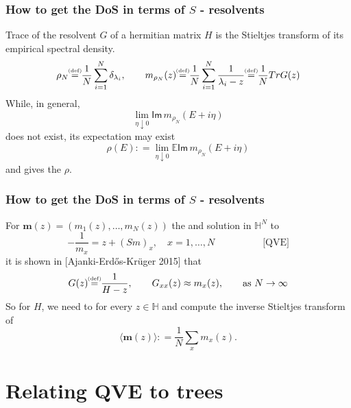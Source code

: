 \documentclass{beamer}
\numberwithin{equation}{section}
\newcommand{\eqbydef}{\mathrel{\stackrel{\hspace*{-3mm}\text{\tiny(def)}\hspace*{-3mm}}{=}}}
\newcommand{\deq}{\mathrel{\mathop:}=}
\renewcommand{\Im}{\mathsf{Im}\,}
\newcommand{\E}{{\mathbb E }}
\newcommand{\Cr}{\color{red}}
\renewcommand{\emph}[1]{{\Cr{#1}}}
\newcommand{\bemph}[1]{\textbf{\Cr{#1}}}
\begin{document}
\begin{frame}
\frametitle{How to get the DoS in terms of $S$ - resolvents}
\bemph{Obvious:} Trace of the resolvent $G$ of a hermitian matrix $H$ is the Stieltjes transform of its empirical spectral density.
$$\rho_N\eqbydef \frac{1}{N}\sum_{i=1}^N\delta_{\lambda_i},\quad\quad m_{\rho_N}(z)\eqbydef \frac{1}{N}\sum_{i=1}^N\frac{1}{\lambda_i-z}\eqbydef \frac{1}{N}Tr G(z)$$
While, in general, $$\lim_{\eta\downarrow 0}\Im m_{\rho_N}(E+i\eta)$$ does not exist, its expectation may exist $$\rho(E)\deq \lim_{\eta\downarrow 0}\E \Im m_{\rho_N}(E+i\eta)$$
and gives the \emph{density of states (DoS)} $\rho$.
\end{frame}

\begin{frame}
\frametitle{How to get the DoS in terms of $S$ - resolvents}
\bemph{Highly non-trivial:} For $\mathbf m(z) = (m_1(z),\dots,m_N(z))$ the \emph{unique} and \emph{deterministic} solution in $\mathbb H^N$ to $$-\frac{1}{m_x}=z+(Sm)_x,\quad x=1,\dots,N\quad\quad\quad\quad\quad \text{[QVE]}$$ it is shown in [Ajanki-Erd{\H{o}}s-Kr{\"u}ger 2015] that $$G(z)\eqbydef \frac{1}{H-z},\quad\quad G_{xx}(z) \approx m_x(z),\quad\quad\text{as }N\to\infty$$
So \emph{to compute the DoS} for $H$, we need to \emph{solve the QVE} for every $z\in\mathbb H$ and compute the inverse Stieltjes transform of $$\langle\mathbf m(z)\rangle\deq \frac{1}{N}\sum_x m_x(z).$$
\end{frame}

\section{Relating QVE to trees}
\end{document}
